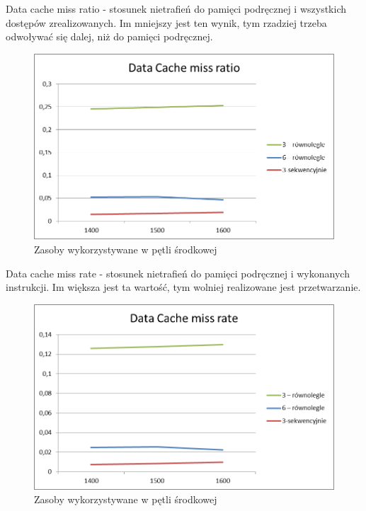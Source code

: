 \documentclass{article}
\begin{document}
Data cache miss ratio - stosunek nietrafień do pamięci podręcznej i wszystkich dostępów zrealizowanych. Im mniejszy jest ten wynik, tym rzadziej trzeba odwoływać się dalej, niż do pamięci podręcznej. 

\begin{figure}[H]
	\centering
	\includegraphics[bb=0 0 1280 960]{./images/wykresy/Data Cache miss ratio.png}
	\caption{Zasoby wykorzystywane w pętli środkowej}
	\label{fig:3medium}
\end{figure}

Data cache miss rate - stosunek nietrafień do pamięci podręcznej i wykonanych instrukcji. Im większa jest ta wartość, tym wolniej realizowane jest przetwarzanie.  

\begin{figure}[H]
	\centering
	\includegraphics[bb=0 0 1280 960]{./images/wykresy/Data Cache miss rate.png}
	\caption{Zasoby wykorzystywane w pętli środkowej}
	\label{fig:3medium}
\end{figure}
\end{document}
